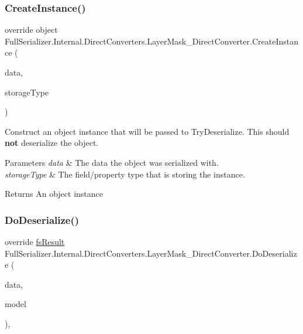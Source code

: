 \subsubsection{\texorpdfstring{Create\+Instance()}{CreateInstance()}}
{\footnotesize\ttfamily override object Full\+Serializer.\+Internal.\+Direct\+Converters.\+Layer\+Mask\+\_\+\+Direct\+Converter.\+Create\+Instance (\begin{DoxyParamCaption}\item[{\hyperlink{class_full_serializer_1_1fs_data}{fs\+Data}}]{data,  }\item[{Type}]{storage\+Type }\end{DoxyParamCaption})\hspace{0.3cm}{\ttfamily [inline]}}



Construct an object instance that will be passed to Try\+Deserialize. This should {\bfseries not} deserialize the object. 


\begin{DoxyParams}{Parameters}
{\em data} & The data the object was serialized with.\\
\hline
{\em storage\+Type} & The field/property type that is storing the instance.\\
\hline
\end{DoxyParams}
\begin{DoxyReturn}{Returns}
An object instance
\end{DoxyReturn}
\mbox{\label{class_full_serializer_1_1_internal_1_1_direct_converters_1_1_layer_mask___direct_converter_a5250547a17e4fdf730f9db241b3d36d0}} 
\subsubsection{\texorpdfstring{Do\+Deserialize()}{DoDeserialize()}}
{\footnotesize\ttfamily override \hyperlink{struct_full_serializer_1_1fs_result}{fs\+Result} Full\+Serializer.\+Internal.\+Direct\+Converters.\+Layer\+Mask\+\_\+\+Direct\+Converter.\+Do\+Deserialize (\begin{DoxyParamCaption}\item[{Dictionary$<$ string, \hyperlink{class_full_serializer_1_1fs_data}{fs\+Data} $>$}]{data,  }\item[{ref Layer\+Mask}]{model }\end{DoxyParamCaption})\hspace{0.3cm}{\ttfamily [inline]}, {\ttfamily [protected]}}



